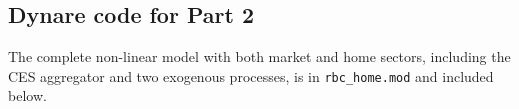 \documentclass[a4paper,12pt]{article}
\theoremstyle{nonitalic}
\begin{document}
\subsection{Dynare code for Part 2}
The complete non-linear model with both market and home sectors, including the CES aggregator and two exogenous processes,
is in \texttt{rbc\_home.mod} and included below.

\begin{lstlisting}[language=Dynare,caption={\texttt{rbc\_home.mod}},label={lst:rbc_home}]

\end{lstlisting}
\end{document}
